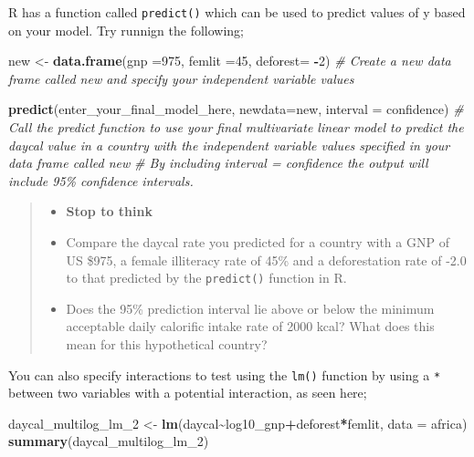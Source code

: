 \documentclass[
]{book}
\newenvironment{Shaded}{\begin{snugshade}}{\end{snugshade}}
\newcommand{\AttributeTok}[1]{\textcolor[rgb]{0.13,0.29,0.53}{#1}}
\newcommand{\CommentTok}[1]{\textcolor[rgb]{0.56,0.35,0.01}{\textit{#1}}}
\newcommand{\DecValTok}[1]{\textcolor[rgb]{0.00,0.00,0.81}{#1}}
\newcommand{\FunctionTok}[1]{\textcolor[rgb]{0.13,0.29,0.53}{\textbf{#1}}}
\newcommand{\NormalTok}[1]{#1}
\newcommand{\OtherTok}[1]{\textcolor[rgb]{0.56,0.35,0.01}{#1}}
\newcommand{\SpecialCharTok}[1]{\textcolor[rgb]{0.81,0.36,0.00}{\textbf{#1}}}
\newcommand{\StringTok}[1]{\textcolor[rgb]{0.31,0.60,0.02}{#1}}
\providecommand{\tightlist}{%
  \setlength{\itemsep}{0pt}\setlength{\parskip}{0pt}}
\begin{document}
R has a function called \texttt{predict()} which can be used to predict values of y based on your model. Try runnign the following;

\begin{Shaded}
\begin{Highlighting}[]
\NormalTok{new }\OtherTok{\textless{}{-}} \FunctionTok{data.frame}\NormalTok{(}\AttributeTok{gnp =}\DecValTok{975}\NormalTok{, }\AttributeTok{femlit =}\DecValTok{45}\NormalTok{, }\AttributeTok{deforest=} \SpecialCharTok{{-}}\DecValTok{2}\NormalTok{)}
\CommentTok{\# Create a new data frame called \textasciigrave{}new\textasciigrave{} and specify your independent variable values}

\FunctionTok{predict}\NormalTok{(enter\_your\_final\_model\_here, }\AttributeTok{newdata=}\NormalTok{new, }\AttributeTok{interval =} \StringTok{\textquotesingle{}confidence\textquotesingle{}}\NormalTok{)}
\CommentTok{\# Call the predict function to use your final multivariate linear model to predict the daycal value in a country with the independent variable values specified in your data frame called \textasciigrave{}new\textasciigrave{}}
\CommentTok{\# By including interval = \textquotesingle{}confidence\textquotesingle{} the output will include 95\% confidence intervals.}
\end{Highlighting}
\end{Shaded}

\begin{quote}
\begin{itemize}
\tightlist
\item
  \textbf{Stop to think}
\item
  Compare the daycal rate you predicted for a country with a GNP of US \$975, a female illiteracy rate of 45\% and a deforestation rate of -2.0 to that predicted by the \texttt{predict()} function in R.
\item
  Does the 95\% prediction interval lie above or below the minimum acceptable daily calorific intake rate of 2000 kcal? What does this mean for this hypothetical country?
\end{itemize}
\end{quote}

You can also specify interactions to test using the \texttt{lm()} function by using a \texttt{*} between two variables with a potential interaction, as seen here;

\begin{Shaded}
\begin{Highlighting}[]
\NormalTok{daycal\_multilog\_lm\_2 }\OtherTok{\textless{}{-}} \FunctionTok{lm}\NormalTok{(daycal}\SpecialCharTok{\textasciitilde{}}\NormalTok{log10\_gnp}\SpecialCharTok{+}\NormalTok{deforest}\SpecialCharTok{*}\NormalTok{femlit, }\AttributeTok{data =}\NormalTok{ africa)}
\FunctionTok{summary}\NormalTok{(daycal\_multilog\_lm\_2)}
\end{Highlighting}
\end{Shaded}
\end{document}
